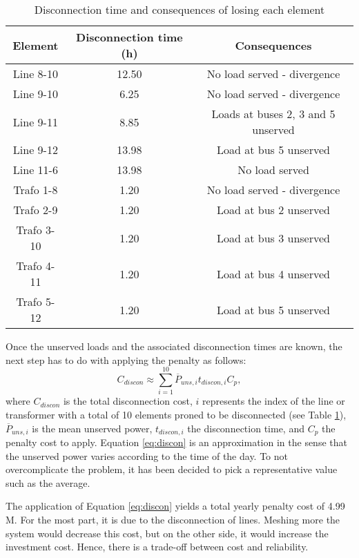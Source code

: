 \begin{table}[!htb]\centering
  \begin{tabular}[]{ccc}
    \hline 
    \textbf{Element} & \textbf{Disconnection time (h)} & \textbf{Consequences} \\
    \hline
    Line 8-10 & 12.50 & No load served - divergence \\
    Line 9-10 & 6.25 & No load served - divergence \\
    Line 9-11 & 8.85 & Loads at buses 2, 3 and 5 unserved \\
    Line 9-12 & 13.98 & Load at bus 5 unserved \\
    Line 11-6 & 13.98 & No load served \\
    Trafo 1-8 & 1.20 & No load served - divergence \\
    Trafo 2-9 & 1.20 & Load at bus 2 unserved \\
    Trafo 3-10 & 1.20 & Load at bus 3 unserved \\
    Trafo 4-11 & 1.20 & Load at bus 4 unserved \\
    Trafo 5-12 & 1.20 & Load at bus 5 unserved \\
    \hline
  \end{tabular}
  \caption{Disconnection time and consequences of losing each element}
  \label{tab:lt1}
\end{table}
Once the unserved loads and the associated disconnection times are known, the next step has to do with applying the penalty as follows:
\begin{equation}
  C_{discon} \approx \sum_{i=1}^{10} \overline{P}_{uns,i} t_{discon,i} C_p,
  \label{eq:discon}
\end{equation}
where $C_{discon}$ is the total disconnection cost, $i$ represents the index of the line or transformer with a total of 10 elements proned to be disconnected (see Table \ref{tab:lt1}), $\overline{P}_{uns,i}$ is the mean unserved power, $t_{discon,i}$ the disconnection time, and $C_p$ the penalty cost to apply. Equation \ref{eq:discon} is an approximation in the sense that the unserved power varies according to the time of the day. To not overcomplicate the problem, it has been decided to pick a representative value such as the average. 

The application of Equation \ref{eq:discon} yields a total yearly penalty cost of 4.99 M\texteuro. For the most part, it is due to the disconnection of lines. Meshing more the system would decrease this cost, but on the other side, it would increase the investment cost. Hence, there is a trade-off between cost and reliability.

